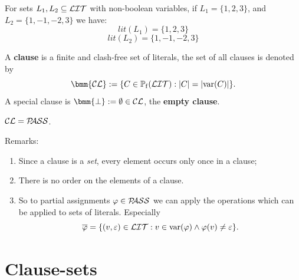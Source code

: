 \documentclass[12pt]{book}
\begin{document}
\begin{examp}\label{exp:lit1}
      For sets $L_1, L_2 \subseteq \mathcal{LIT}$ with non-boolean variables, if $L_1 = \{1, 2, 3 \}$, and $L_2 = \{1, -1, -2, 3 \}$ we have:
      $$lit(L_1) = \{1, 2, 3\}$$
      $$lit(L_2) = \{1, -1, -2, 3\}$$
\end{examp}
\begin{defi}\label{def:cl}
      A \textbf{clause} is a finite and clash-free set of literals, the set of all clauses is denoted by
      $$\bmm{\Cl} := \set{C \in \pote(\Lit) : \abs{C} = \abs{\var(C)}}.$$
      A special clause is $\bmm{\bot} := \es \in \Cl$, the \textbf{empty clause}.
\end{defi}
\begin{lem}\label{lem::CLPASS}
      $\mathcal{CL} = \mathcal{P\hspace{-0.32em}ASS}$.
\end{lem}
Remarks:
\begin{enumerate}
      \item Since a clause is a \textit{set}, every element occurs only once in a clause;
      \item There is no order on the elements of a clause.
      \item So to partial assignments $\varphi \in \mathcal{P\hspace{-0.32em}ASS}$ we can apply the operations which can be applied to sets of literals. Especially
      $$\overline{\varphi} = \{ (v,\varepsilon) \in \mathcal{LIT} : v \in \operatorname{var}(\varphi) \wedge \varphi(v) \ne \varepsilon \}.$$
\end{enumerate}
\section{Clause-sets}
\label{sec:cls}
\end{document}
